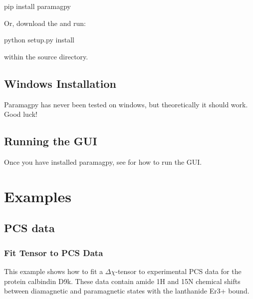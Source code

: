 \documentclass[a4paper,10pt,english]{sphinxmanual}
\begin{document}
%
\begin{sphinxVerbatim}[commandchars=\\\{\}]
\PYGZdl{} pip install paramagpy
\end{sphinxVerbatim}

Or, download the  and run:

%
\begin{sphinxVerbatim}[commandchars=\\\{\}]
\PYGZdl{} python setup.py install
\end{sphinxVerbatim}

within the source directory.


\subsection{Windows Installation}
\label{\detokenize{install:windows-installation}}
Paramagpy has never been tested on windows, but theoretically it should work. Good luck!


\subsection{Running the GUI}
\label{\detokenize{install:running-the-gui}}
Once you have installed paramagpy, see {\hyperref[\detokenize{paramagpy_gui:paramagpy-gui}]{}} for how to run the GUI.


\section{Examples}
\label{\detokenize{examples/index:examples}}\label{\detokenize{examples/index:examples-index}}\label{\detokenize{examples/index::doc}}

\subsection{PCS data}
\label{\detokenize{examples/index:pcs-data}}

\subsubsection{Fit Tensor to PCS Data}
\label{\detokenize{examples/pcs_fit:fit-tensor-to-pcs-data}}\label{\detokenize{examples/pcs_fit:pcs-fit}}\label{\detokenize{examples/pcs_fit::doc}}
This example shows how to fit a \({\Delta\chi}\)-tensor to experimental PCS data for the protein calbindin D9k. These data contain amide 1H and 15N chemical shifts between diamagnetic and paramagnetic states with the lanthanide Er3+ bound.
\end{document}

